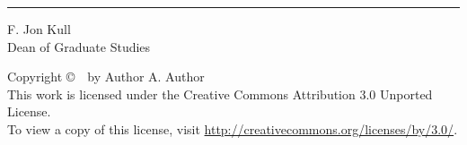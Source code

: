\begin{titlepage}
\begin{minipage}[b]{\linewidth}
    \begin{flushleft}
        \vspace*{-0.44in}
        \singlespacing
        \begin{minipage}[b]{0.45\linewidth}
            \hrule \vspace{0.1in}
            F. Jon Kull \\              %
            Dean of Graduate Studies
        \end{minipage}
    \end{flushleft}
    
 \end{minipage}
 
\end{titlepage}


\newpage
\thispagestyle{empty}
\begin{center}
    \vspace*{\fill}
    Copyright \copyright\ \the\year\ by Author A. Author \\ 
    This work is licensed under the Creative Commons Attribution 3.0 Unported License. \\
    To view a copy of this license, visit \url{http://creativecommons.org/licenses/by/3.0/}.
    \vspace*{\fill}
\end{center}

\newpage


\newpage
{}


{
    \newpage
    \hypersetup{linkcolor=black}
    \tableofcontents
    
    \newpage
    \listoftables

    \newpage
    \listoffigures
}
